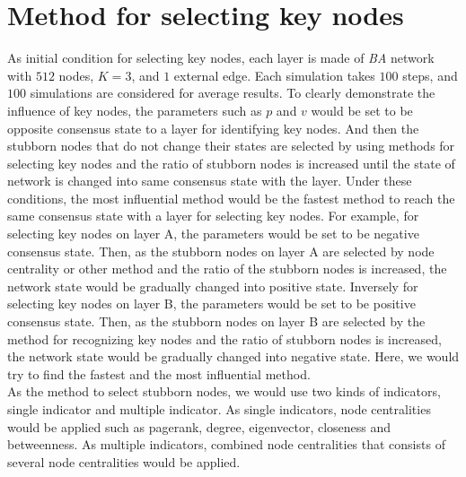 \section{Method for selecting key nodes}
\label{sec:method for finding key nodes}
As initial condition for selecting key nodes, each layer is made of \textit{BA} network with $512$ nodes, $K=3$, and $1$ external edge. Each simulation takes $100$ steps, and $100$ simulations are considered for average results. To clearly demonstrate the influence of key nodes, the parameters such as $p$ and $v$ would be set to be opposite consensus state to a layer for identifying key nodes. And then the stubborn nodes that do not change their states are selected by using methods for selecting key nodes and the ratio of stubborn nodes is increased until the state of network is changed into same consensus state with the layer. Under these conditions, the most influential method would be the fastest method to reach the same consensus state with a layer for selecting key nodes. For example, for selecting key nodes on layer A, the parameters would be set to be negative consensus state. Then, as the stubborn nodes on layer A are selected by node centrality or other method and the ratio of the stubborn nodes is increased, the network state would be gradually changed into positive state. Inversely for selecting key nodes on layer B, the parameters would be set to be positive consensus state. Then, as the stubborn nodes on layer B are selected by the method for recognizing key nodes and the ratio of stubborn nodes is increased, the network state would be gradually changed into negative state. Here, we would try to find the fastest and the most influential method.\\
As the method to select stubborn nodes, we would use two kinds of indicators, single indicator and multiple indicator. As single indicators, node centralities would be applied such as pagerank, degree, eigenvector, closeness and betweenness. As multiple indicators, combined node centralities that consists of several node centralities would be applied.\\
  
